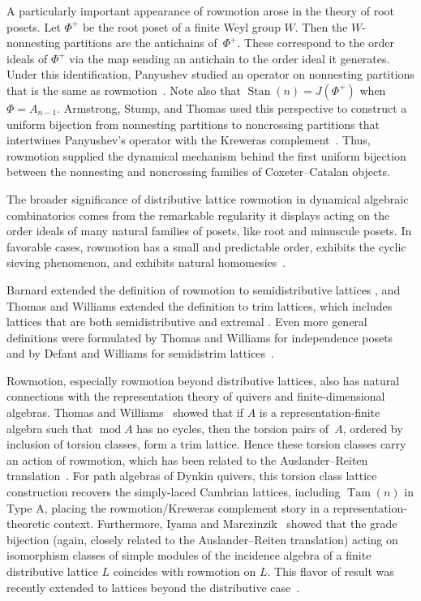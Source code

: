 \documentclass[11pt]{amsart}
\newcommand{\Tam}[1]{\operatorname{Tam}({#1})}
\newcommand{\Stan}[1]{\operatorname{Stan}({#1})}
\theoremstyle{definition}
\begin{document}
A particularly important appearance of rowmotion arose in the theory of root posets. Let $\Phi^+$ be the root poset of a finite Weyl group $W$.  Then the $W$-nonnesting partitions are the antichains of~$\Phi^+$.  These correspond to the order ideals of $\Phi^+$ via the map sending an antichain to the order ideal it generates. Under this identification, Panyushev studied an operator on nonnesting partitions that is the same as rowmotion~\cite{panyushev2009orbits}. Note also that $\Stan{n} = J(\Phi^+)$ when $\Phi=A_{n-1}$. Armstrong, Stump, and Thomas used this perspective to construct a uniform bijection from nonnesting partitions to noncrossing partitions that intertwines Panyushev's operator with the Kreweras complement~\cite{armstrong2013uniform}. Thus, rowmotion supplied the dynamical mechanism behind the first uniform bijection between the nonnesting and noncrossing families of Coxeter--Catalan objects.

The broader significance of distributive lattice rowmotion in dynamical algebraic combinatorics comes from the remarkable regularity it displays acting on the order ideals of many natural families of posets, like root and minuscule posets. In favorable cases, rowmotion has a small and predictable order, exhibits the cyclic sieving phenomenon, and exhibits natural homomesies~\cite{armstrong2013uniform,rush2013orbits,propp2015homomesy,striker2012rowmotion,hopkins2024order}. 

Barnard extended the definition of rowmotion to semidistributive lattices \cite{barnard2019canonical}, and Thomas and Williams extended the definition to trim lattices, which includes lattices that are both semidistributive and extremal \cite{thomas2019rowmotion}. Even more general definitions were formulated by Thomas and Williams for independence posets~\cite{thomas2019independence} and by Defant and Williams for semidistrim lattices~\cite{defant2023semidistrim}. 

Rowmotion, especially rowmotion beyond distributive lattices, also has natural connections with the representation theory of quivers and finite-dimensional algebras. Thomas and Williams~\cite{thomas2019rowmotion} showed that if $A$ is a representation-finite algebra such that $\operatorname{mod} A$ has no cycles, then the torsion pairs of~$A$, ordered by inclusion of torsion classes, form a trim lattice. Hence these torsion classes carry an action of rowmotion, which has been related to the Auslander--Reiten translation~\cite{barnard2021dynamical}. For path algebras of Dynkin quivers, this torsion class lattice construction recovers the simply-laced Cambrian lattices, including $\Tam{n}$ in Type A, placing the rowmotion/Kreweras complement story in a representation-theoretic context. Furthermore, Iyama and Marczinzik~\cite{iyama2022distributive} showed that the grade bijection (again, closely related to the Auslander--Reiten translation) acting on isomorphism classes of simple modules of the incidence algebra of a finite distributive lattice $L$ coincides with rowmotion on $L$.  This flavor of result was recently extended to lattices beyond the distributive case~\cite{klasz2025auslander, defant2025echelonmotion}.
\end{document}
